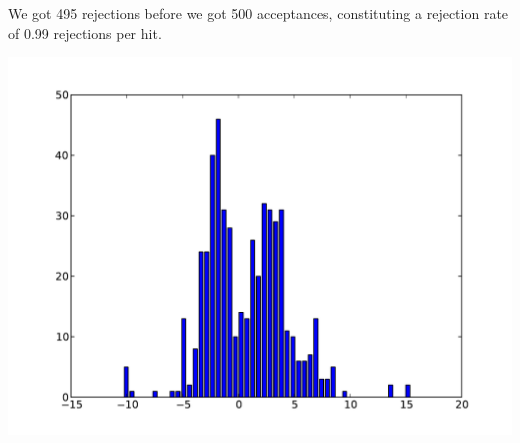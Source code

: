 \documentclass[solution, letterpaper]{cs121}
\begin{document}
\begin{empfile}
We got 495 rejections before we got 500 acceptances, constituting a rejection rate of 0.99 rejections per hit.

\subproblem %

\begin{center}
\includegraphics[scale=0.8]{hasty_metro_histogram.pdf}
\end{center}


\end{empfile}

\immediate{}
\end{document}
